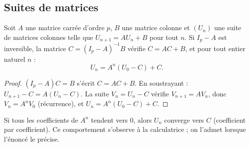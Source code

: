 \subsection{Suites de matrices}
\begin{theorem}[Suite $U_{n+1}=AU_n+B$]
Soit $A$ une matrice carrée d'ordre $p$, $B$ une matrice colonne et $(U_n)$ une suite de matrices colonnes telle que $U_{n+1}=AU_n+B$ pour tout $n$. Si $I_p-A$ est inversible, la matrice $C=(I_p-A)^{-1}B$ vérifie $C=AC+B$, et pour tout entier naturel $n$ :
\[U_n=A^n\left(U_0-C\right)+C.\]
\end{theorem}
\begin{proof}
$(I_p-A)C=B$ s'écrit $C=AC+B$. En soustrayant : $U_{n+1}-C=A(U_n-C)$. La suite $V_n=U_n-C$ vérifie $V_{n+1}=AV_n$, donc $V_n=A^nV_0$ (récurrence), et $U_n=A^n(U_0-C)+C$.
\end{proof}
\begin{keypoint}
Si tous les coefficients de $A^n$ tendent vers $0$, alors $U_n$ converge vers $C$ (coefficient par coefficient). Ce comportement s'observe à la calculatrice ; on l'admet lorsque l'énoncé le précise.
\end{keypoint}


